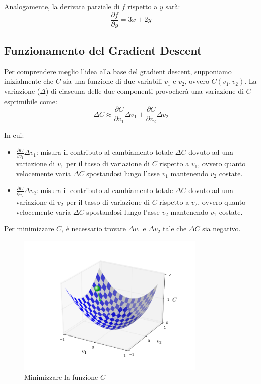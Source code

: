 Analogamente, la derivata parziale di $f$ rispetto a $y$ sarà: 
\[\frac{\partial f}{\partial y} = 3x + 2y\]

\subsection{Funzionamento del Gradient Descent}
Per comprendere meglio l’idea alla base del gradient descent, 
supponiamo inizialmente che $C$ sia una funzione di due variabili 
$v_1$ e $v_2$, ovvero $C(v_1, v_2)$. La variazione ($\Delta$) di ciascuna delle due componenti 
provocherà una variazione di $C$ esprimibile come:
\begin{equation}
    \Delta C \approx \frac{\partial C}{\partial v_1} \Delta v_1 + \frac{\partial C}{\partial v_2} \Delta v_2
    \label{eq:gd1}
\end{equation}

In cui:
\begin{itemize}
    \item $\frac{\partial C}{\partial v_1} \Delta v_1$: misura il contributo al cambiamento 
    totale $\Delta C$ dovuto ad una variazione di $v_1$ per il tasso di variazione di $C$ rispetto a $v_1$,  
    ovvero quanto velocemente varia $\Delta C$ spostandosi lungo l'asse $v_1$ mantenendo $v_2$ costate.
 

    \item $\frac{\partial C}{\partial v_2} \Delta v_2$: misura il contributo al cambiamento 
    totale $\Delta C$ dovuto ad una variazione di $v_2$ per il tasso di variazione di $C$ rispetto a $v_2$,  
    ovvero quanto velocemente varia $\Delta C$ spostandosi lungo l'asse $v_2$ mantenendo $v_1$ costate.
    
\end{itemize}

Per minimizzare $C$, è necessario trovare $\Delta v_1$ e $\Delta v_2$ tale che 
$\Delta C$ sia negativo. 

\begin{figure}[H]
    \centering
    \includegraphics[width=0.8\textwidth]{Immagini/Grafici/valley_with_ball.png}
    \caption{Minimizzare la funzione $C$}

\end{figure}

